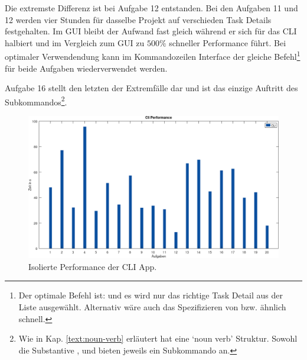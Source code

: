\documentclass[oneside,bibliography=totocnumbered,BCOR=5mm]{scrbook}
\begin{document}
Die extremste Differenz ist bei Aufgabe 12 entstanden. Bei den Aufgaben 11
und 12 werden vier Stunden für dasselbe Projekt auf verschieden Task Details
festgehalten. Im GUI bleibt der Aufwand fast gleich während er sich für
das CLI halbiert und im Vergleich zum GUI zu $500\%$ schneller Performance
führt. Bei optimaler Verwendendung kann im Kommandozeilen Interface der
gleiche Befehl\footnote{Der optimale Befehl ist:  und es wird nur das richtige Task Detail aus der Liste
ausgewählt. Alternativ wäre auch das Spezifizieren von  bzw.
 ähnlich schnell.} für beide Aufgaben wiederverwendet werden.

\medskip

Aufgabe 16 stellt den letzten der Extremfälle dar und ist das einzige Auftritt
des  Subkommandos\footnote{Wie in Kap. \ref{text:noun-verb}
erläutert hat  eine `noun verb' Struktur. Sowohl
die Substantive ,  und
 bieten jeweils ein  Subkommando an.}.

\begin{figure}[H]
  \centering
  \includegraphics[scale=0.36]{performance-cli.png}
  \caption{Isolierte Performance der CLI App.}
  \label{fig:performance-cli}
\end{figure}
\end{document}
